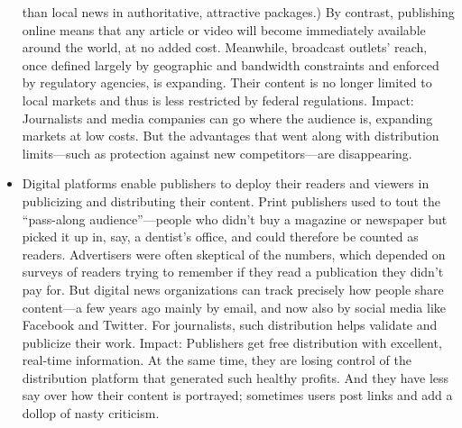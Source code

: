 \begin{itemize}
than local news in authoritative, attractive packages.) By contrast, publishing
online means that any article or video will become immediately available
around the world, at no added cost. Meanwhile, broadcast outlets' reach,
once defined largely by geographic and bandwidth constraints and enforced
by regulatory agencies, is expanding. Their content is no longer limited to
local markets and thus is less restricted by federal regulations.
Impact: Journalists and media companies can go where the audience is, expanding
markets at low costs. But the advantages that went along with distribution
limits—such as protection against new competitors—are disappearing.
\item Digital platforms enable publishers to deploy their readers and viewers
in publicizing and distributing their content. Print publishers used
to tout the ``pass-along audience''—people who didn't buy a magazine or
newspaper but picked it up in, say, a dentist's office, and could therefore be
counted as readers. Advertisers were often skeptical of the numbers, which
depended on surveys of readers trying to remember if they read a publication
they didn't pay for. But digital news organizations can track precisely
how people share content—a few years ago mainly by email, and now also
by social media like Facebook and Twitter. For journalists, such distribution
helps validate and publicize their work.
Impact: Publishers get free distribution with excellent, real-time information.
At the same time, they are losing control of the distribution platform that
generated such healthy profits. And they have less say over how their content
is portrayed; sometimes users post links and add a dollop of nasty criticism.
\end{itemize}

